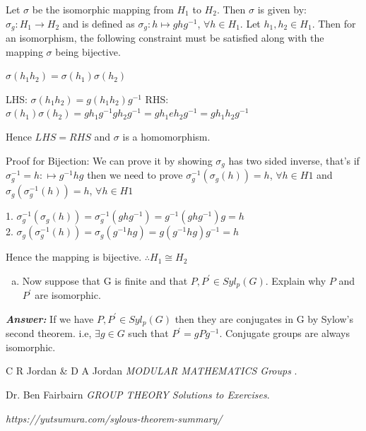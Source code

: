 \documentclass[11pt,a4paper]{article}
\begin{document}
\begin{enumerate}[1.]
\begin{enumerate}[4.]
\begin{flushleft}
			Let $\sigma$ be the isomorphic mapping from $H_1$ to $H_2$. Then $\sigma$ is given by:
			$\sigma_g: H_1 \to H_2$ and is defined as $\sigma_g: h \mapsto ghg^{-1}$, $\forall h \in H_1$. Let $h_1, h_2 \in H_1$. Then for an isomorphism, the following constraint must be satisfied along with the mapping $\sigma$ being bijective.
			
			$\sigma(h_1h_2) = \sigma(h_1)\sigma(h_2)$
			
			LHS: $\sigma(h_1h_2) = g(h_1h_2)g^{-1}$
			RHS: $\sigma(h_1)\sigma(h_2) = gh_1g^{-1}gh_2g^{-1} = gh_1eh_2g^{-1} = gh_1h_2g^{-1}$
			
			Hence $LHS = RHS$ and $\sigma$ is a homomorphism.
			
			Proof for Bijection: We can prove it by showing $\sigma_g$ has two sided inverse, that's if $\sigma_g^{-1} = h: \mapsto g^{-1}hg$ then we need to prove $\sigma_g^{-1}(\sigma_g(h)) = h$, $\forall h \in H1$ and $\sigma_g(\sigma_g^{-1}(h)) = h$, $\forall h \in H1$
			
			1. $\sigma_g^{-1}(\sigma_g(h)) = \sigma_g^{-1}(ghg^{-1}) = g^{-1}(ghg^{-1})g = h$\\
			2. $\sigma_g(\sigma_g^{-1}(h)) = \sigma_g(g^{-1}hg) = g(g^{-1}hg)g^{-1} = h$
			
			Hence the mapping is bijective. $\therefore H_1 \cong H_2 $
		\end{flushleft}
		\begin{enumerate}[(b)]
			\item Now suppose that G is finite and that $P, P^{\prime} \in Syl_p(G)$. Explain why $P$ and $P^{\prime}$ are isomorphic.
		\end{enumerate}
		\begin{flushleft}
			\textbf{\textit{Answer:}}
			If we have $P, P^{\prime} \in Syl_p(G)$ then they are conjugates in G by Sylow's second theorem. i.e, $\exists g \in G$ such that  $P^{\prime} = gPg^{-1}$. Conjugate groups are always isomorphic.
		\end{flushleft} 
	\end{enumerate}
\end{enumerate}
	
	\begin{thebibliography}{unsrt}
		
		C R Jordan \& D A Jordan \emph{MODULAR MATHEMATICS Groups }.
		
		Dr. Ben Fairbairn \emph{GROUP THEORY Solutions to Exercises}.
		
		\emph{https://yutsumura.com/sylows-theorem-summary/}
		
	\end{thebibliography}
	
\end{document}
